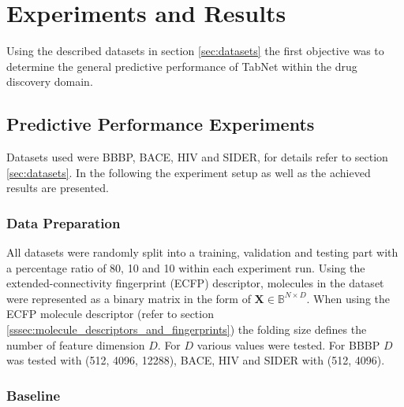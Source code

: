 \documentclass[../main.tex]{subfiles}
\begin{document}
\section{Experiments and Results} \label{sec:results}

Using the described datasets in section \ref{sec:datasets} the first objective was to determine the general predictive performance of TabNet within the drug discovery domain.

\subsection{Predictive Performance Experiments}

Datasets used were BBBP, BACE, HIV and SIDER, for details refer to section \ref{sec:datasets}. In the following the experiment setup as well as the achieved results are presented. 

\subsubsection{Data Preparation} 

All datasets were randomly split into a training, validation and testing part with a percentage ratio of 80, 10 and 10 within each experiment run. Using the extended-connectivity fingerprint (ECFP) descriptor, molecules in the dataset were represented as a binary matrix in the form of $\mathbf{X} \in \mathbb{B}^{N \times D}$. When using the ECFP molecule descriptor (refer to section \ref{sssec:molecule_descriptors_and_fingerprints}) the folding size defines the number of feature dimension $D$. For $D$ various values were tested. For BBBP $D$ was tested with (512, 4096, 12288), BACE, HIV and SIDER with (512, 4096).

\subsubsection{Baseline} \label{sssec:mlp_baseline}
\end{document}
